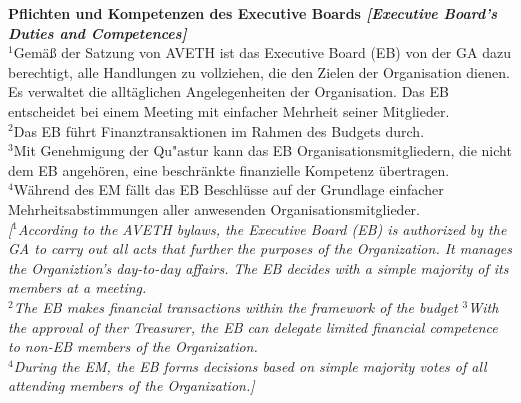 \documentclass[10pt]{article}
\newcounter{qcounter}
\begin{document}
\begin{list}{{\bf Artikel :~}}{}
\item {\bf Pflichten und Kompetenzen des Executive Boards {\it[Executive Board's Duties and Competences]}}\label{EB}\\
$^{1}$Gemäß der Satzung von AVETH ist das Executive Board (EB) von der GA dazu berechtigt, alle Handlungen zu vollziehen, die den Zielen der Organisation dienen. Es verwaltet die alltäglichen Angelegenheiten der Organisation. Das EB entscheidet bei einem Meeting mit einfacher Mehrheit seiner Mitglieder.\\
$^{2}$Das EB führt Finanztransaktionen im Rahmen des Budgets durch.\\ 
$^{3}$Mit Genehmigung der Qu"astur kann das EB Organisationsmitgliedern, die nicht dem EB angehören, eine beschränkte finanzielle Kompetenz übertragen.\\
$^{4}$Während des EM fällt das EB Beschlüsse auf der Grundlage einfacher Mehrheitsabstimmungen aller anwesenden
Organisationsmitglieder.\\
{\it[$^{1}$According to the AVETH bylaws, the Executive Board (EB) is authorized by the GA to carry out all acts that further the purposes of the Organization. It manages the Organiztion's day-to-day affairs. The EB decides with a simple majority of its members at a meeting.\\
$^{2}$The EB makes financial transactions within the framework of the budget
$^{3}$With the approval of ther Treasurer, the EB can delegate limited financial competence to non-EB members of the Organization.\\
$^{4}$During the EM, the EB forms decisions based on simple majority votes of all attending members of the Organization.]}


\end{list}
\end{document}
